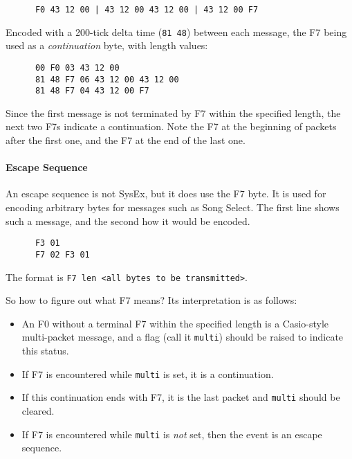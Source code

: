    \begin{verbatim}
      F0 43 12 00 | 43 12 00 43 12 00 | 43 12 00 F7
   \end{verbatim}

   Encoded with a 200-tick delta time (\texttt{81 48}) between each message,
   the F7 being used as a \textsl{continuation} byte, with length values:

   \begin{verbatim}
      00 F0 03 43 12 00
      81 48 F7 06 43 12 00 43 12 00
      81 48 F7 04 43 12 00 F7
   \end{verbatim}

   Since the first message is not terminated by F7 within the specified
   length, the next two F7s indicate a continuation.
   Note the F7 at the beginning of packets after the first one, and
   the F7 at the end of the last one.

\paragraph{Escape Sequence}
\label{paragraph:patterns_escape_sequence}

   An escape sequence is not SysEx, but it does use the F7 byte.
   It is used for encoding arbitrary bytes for messages such as Song Select.
   The first line shows such a message, and the second how it would be encoded.

   \begin{verbatim}
      F3 01
      F7 02 F3 01
   \end{verbatim}

   The format is \texttt{F7 len <all bytes to be transmitted>}.

   So how to figure out what F7 means?
   Its interpretation is as follows:

   \begin{itemize}
      \item An F0 without a terminal F7 within the specified length
         is a Casio-style multi-packet message,
         and a flag (call it \texttt{multi})
         should be raised to indicate this status.
      \item If F7 is encountered while \texttt{multi} is set,
         it is a continuation.
      \item If this continuation ends with F7, it is the last packet and
         \texttt{multi} should be cleared.
      \item If F7 is encountered while \texttt{multi} is \textsl{not} set,
         then the event is an escape sequence.
   \end{itemize}

